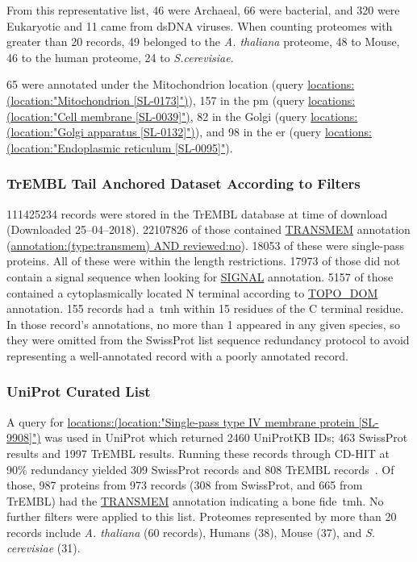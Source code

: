 From this representative list, 46 were Archaeal, 66 were bacterial, and 320 were Eukaryotic and 11 came from dsDNA viruses.
When counting proteomes with greater than 20 records, 49 belonged to the \textit{A. thaliana} proteome, 48 to Mouse, 46 to the human proteome, 24 to \textit{S.cerevisiae}. %

65 were annotated under the Mitochondrion location (query \url{locations:(location:"Mitochondrion [SL-0173]")}), 157 in the \gls{pm} (query \url{locations:(location:"Cell membrane [SL-0039]")}, 82 in the Golgi (query \url{locations:(location:"Golgi apparatus [SL-0132]")}), and 98 in the \gls{er} (query \url{locations:(location:"Endoplasmic reticulum [SL-0095]"}).

\subsubsection{TrEMBL Tail Anchored Dataset According to Filters}
111425234 records were stored in the TrEMBL database at time of download (Downloaded 25--04--2018).
22107826 of those contained \url{TRANSMEM} annotation (\url{annotation:(type:transmem) AND reviewed:no}).
18053 of these were single-pass proteins.
All of these were within the length restrictions.
17973 of those did not contain a signal sequence when looking for \url{SIGNAL} annotation.
5157 of those contained a cytoplasmically located N terminal according to \url{TOPO_DOM} annotation.
155 records had a~\gls{tmh} within 15 residues of the C terminal residue.
In those record's annotations, no more than 1 appeared in any given species, so they were omitted from the SwissProt list sequence redundancy protocol to avoid representing a well-annotated record with a poorly annotated record.

\subsubsection{UniProt Curated List}
A query for \url{locations:(location:"Single-pass type IV membrane protein [SL-9908]")} was used in UniProt which returned 2460 UniProtKB IDs; 463 SwissProt results and 1997 TrEMBL results.
Running these records through CD-HIT at 90\% redundancy yielded 309 SwissProt records and 808 TrEMBL records~\cite{Huang2010, Wu2011}.
Of those, 987 proteins from 973 records (308 from SwissProt, and 665 from TrEMBL) had the \url{TRANSMEM} annotation indicating a bone fide~\gls{tmh}.
No further filters were applied to this list.
Proteomes represented by more than 20 records include \textit{A. thaliana} (60 records), Humans (38), Mouse (37), and \textit{S. cerevisiae} (31). %

